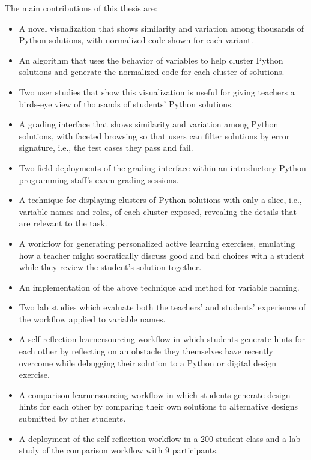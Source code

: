 The main contributions of this thesis are:
\begin{itemize}
\item A novel visualization that shows similarity and variation among thousands of Python solutions, with normalized code shown for each variant. 
\item An algorithm that uses the behavior of variables to help cluster Python solutions and generate the normalized code for each cluster of solutions.
\item Two user studies that show this visualization is useful for giving teachers a birds-eye view of thousands of students' Python solutions.
\item A grading interface that shows similarity and variation among Python solutions, with faceted browsing so that users can filter solutions by error signature, i.e., the test cases they pass and fail. 
\item Two field deployments of the grading interface within an introductory Python programming staff's exam grading sessions.
\item A technique for displaying clusters of Python solutions with only a slice, i.e., variable names and roles, of each cluster exposed, revealing the details that are relevant to the task. %
\item A workflow for generating personalized active learning exercises, emulating how a teacher might socratically discuss good and bad choices with a student while they review the student's solution together. 
\item An implementation of the above technique and method for variable naming. %
\item Two lab studies which evaluate both the teachers' and students' experience of the workflow applied to variable names.
\item A self-reflection learnersourcing workflow in which students generate hints for each other by reflecting on an obstacle they themselves have recently overcome while debugging their solution to a Python or digital design exercise.
\item A comparison learnersourcing workflow in which students generate design hints for each other by comparing their own solutions to alternative designs submitted by other students.
\item A deployment of the self-reflection workflow in a 200-student class and a lab study of the comparison workflow with 9 participants.
\end{itemize}

